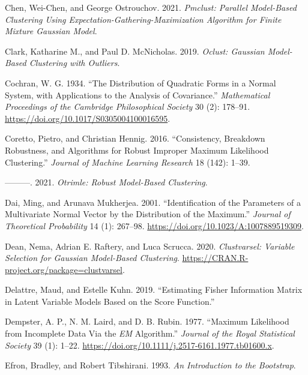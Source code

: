 \begin{CSLReferences}{1}{0}
\leavevmode{}%
Chen, Wei-Chen, and George Ostrouchov. 2021. \emph{Pmclust: Parallel Model-Based Clustering Using Expectation-Gathering-Maximization Algorithm for Finite Mixture Gaussian Model}.

\leavevmode{}%
Clark, Katharine M., and Paul D. McNicholas. 2019. \emph{Oclust: Gaussian Model-Based Clustering with Outliers}.

\leavevmode{}%
Cochran, W. G. 1934. {``The Distribution of Quadratic Forms in a Normal System, with Applications to the Analysis of Covariance.''} \emph{Mathematical Proceedings of the Cambridge Philosophical Society} 30 (2): 178--91. \url{https://doi.org/10.1017/S0305004100016595}.

\leavevmode{}%
Coretto, Pietro, and Christian Hennig. 2016. {``Consistency, Breakdown Robustness, and Algorithms for Robust Improper Maximum Likelihood Clustering.''} \emph{Journal of Machine Learning Research} 18 (142): 1--39.

\leavevmode{}%
---------. 2021. \emph{Otrimle: Robust Model-Based Clustering}.

\leavevmode{}%
Dai, Ming, and Arunava Mukherjea. 2001. {``Identification of the {Parameters} of a {Multivariate Normal Vector} by the {Distribution} of the {Maximum}.''} \emph{Journal of Theoretical Probability} 14 (1): 267--98. \url{https://doi.org/10.1023/A:1007889519309}.

\leavevmode{}%
Dean, Nema, Adrian E. Raftery, and Luca Scrucca. 2020. \emph{Clustvarsel: Variable Selection for Gaussian Model-Based Clustering}. \url{https://CRAN.R-project.org/package=clustvarsel}.

\leavevmode{}%
Delattre, Maud, and Estelle Kuhn. 2019. {``Estimating {Fisher Information Matrix} in {Latent Variable Models} Based on the {Score Function}.''}

\leavevmode{}%
Dempster, A. P., N. M. Laird, and D. B. Rubin. 1977. {``Maximum {Likelihood} from {Incomplete Data Via} the {\emph{EM}} {Algorithm}.''} \emph{Journal of the Royal Statistical Society} 39 (1): 1--22. \url{https://doi.org/10.1111/j.2517-6161.1977.tb01600.x}.

\leavevmode{}%
Efron, Bradley, and Robert Tibshirani. 1993. \emph{An {Introduction} to the {Bootstrap}}.


\end{CSLReferences}
